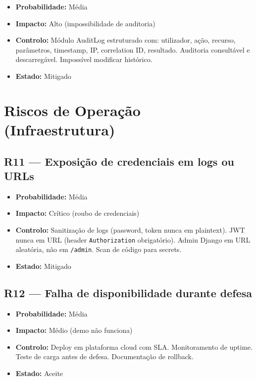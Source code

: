 \documentclass[a4paper,11pt]{article}
\begin{document}
\begin{itemize}[nosep]
    \item \textbf{Probabilidade:} Média
    \item \textbf{Impacto:} Alto (impossibilidade de auditoria)
    \item \textbf{Controlo:} Módulo AuditLog estruturado com: utilizador, ação,
          recurso, parâmetros, timestamp, IP, correlation ID, resultado. Auditoria
          consultável e descarregável. Impossível modificar histórico.
    \item \textbf{Estado:} Mitigado
\end{itemize}

\section{Riscos de Operação (Infraestrutura)}

\subsection*{R11 — Exposição de credenciais em logs ou URLs}

\begin{itemize}[nosep]
    \item \textbf{Probabilidade:} Média
    \item \textbf{Impacto:} Crítico (roubo de credenciais)
    \item \textbf{Controlo:} Sanitização de logs (password, token nunca em plaintext).
          JWT nunca em URL (header \texttt{Authorization} obrigatório). Admin Django
          em URL aleatória, não em \texttt{/admin}. Scan de código para secrets.
    \item \textbf{Estado:} Mitigado
\end{itemize}

\subsection*{R12 — Falha de disponibilidade durante defesa}

\begin{itemize}[nosep]
    \item \textbf{Probabilidade:} Média
    \item \textbf{Impacto:} Médio (demo não funciona)
    \item \textbf{Controlo:} Deploy em plataforma cloud com SLA. Monitoramento
          de uptime. Teste de carga antes de defesa. Documentação de rollback.
    \item \textbf{Estado:} Aceite
\end{itemize}
\end{document}
